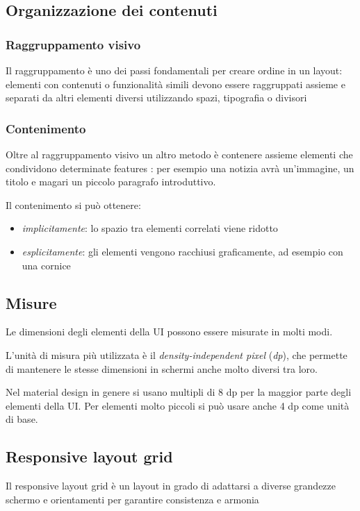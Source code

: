\documentclass[12pt, a4paper]{report}
\begin{document}
		\subsection{Organizzazione dei contenuti}
			\subsubsection{Raggruppamento visivo}
			Il raggruppamento è uno dei passi fondamentali per creare ordine in un layout: elementi con contenuti o funzionalità simili devono essere raggruppati assieme e separati da altri elementi diversi utilizzando spazi, tipografia o divisori

			\subsubsection{Contenimento}
			Oltre al raggruppamento visivo un altro metodo è contenere assieme elementi che condividono determinate features			\cite{layout_organizzazione}:
			per esempio una notizia avrà un'immagine, un titolo e magari un piccolo paragrafo introduttivo.

			Il contenimento si può ottenere:
			\begin{itemize}
				\item \textit{implicitamente}: lo spazio tra elementi correlati viene ridotto
    			\item \textit{esplicitamente}: gli elementi vengono racchiusi graficamente, ad esempio con una cornice
			\end{itemize}

		\subsection{Misure}
		Le dimensioni degli elementi della UI possono essere misurate in molti modi.

		L'unità di misura più utilizzata è il \textit{density-independent pixel} (\textit{dp}), che permette di mantenere le stesse dimensioni in schermi anche molto diversi tra loro.

		Nel material design in genere si usano multipli di 8 dp per la maggior parte degli elementi della UI. Per elementi molto piccoli si può usare anche 4 dp come unità di base.

		\subsection{Responsive layout grid}
			Il responsive layout grid è un layout in grado di adattarsi a diverse grandezze schermo e orientamenti per garantire consistenza e armonia \cite{layout_grid}
\end{document}
